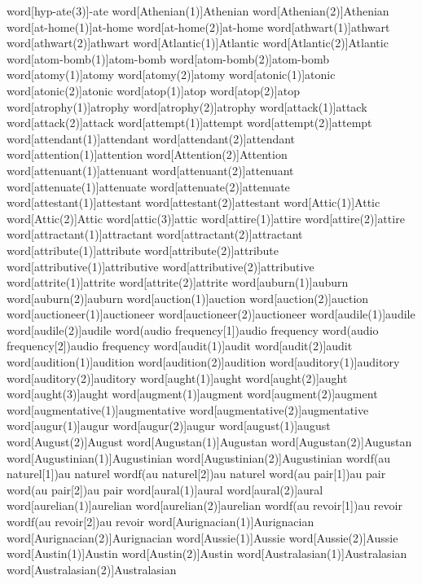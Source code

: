word[hyp-ate(3)]{-ate}
word[Athenian(1)]{Athenian}
word[Athenian(2)]{Athenian}
word[at-home(1)]{at-home}
word[at-home(2)]{at-home}
word[athwart(1)]{athwart}
word[athwart(2)]{athwart}
word[Atlantic(1)]{Atlantic}
word[Atlantic(2)]{Atlantic}
word[atom-bomb(1)]{atom-bomb}
word[atom-bomb(2)]{atom-bomb}
word[atomy(1)]{atomy}
word[atomy(2)]{atomy}
word[atonic(1)]{atonic}
word[atonic(2)]{atonic}
word[atop(1)]{atop}
word[atop(2)]{atop}
word[atrophy(1)]{atrophy}
word[atrophy(2)]{atrophy}
word[attack(1)]{attack}
word[attack(2)]{attack}
word[attempt(1)]{attempt}
word[attempt(2)]{attempt}
word[attendant(1)]{attendant}
word[attendant(2)]{attendant}
word[attention(1)]{attention}
word[Attention(2)]{Attention}
word[attenuant(1)]{attenuant}
word[attenuant(2)]{attenuant}
word[attenuate(1)]{attenuate}
word[attenuate(2)]{attenuate}
word[attestant(1)]{attestant}
word[attestant(2)]{attestant}
word[Attic(1)]{Attic}
word[Attic(2)]{Attic}
word[attic(3)]{attic}
word[attire(1)]{attire}
word[attire(2)]{attire}
word[attractant(1)]{attractant}
word[attractant(2)]{attractant}
word[attribute(1)]{attribute}
word[attribute(2)]{attribute}
word[attributive(1)]{attributive}
word[attributive(2)]{attributive}
word[attrite(1)]{attrite}
word[attrite(2)]{attrite}
word[auburn(1)]{auburn}
word[auburn(2)]{auburn}
word[auction(1)]{auction}
word[auction(2)]{auction}
word[auctioneer(1)]{auctioneer}
word[auctioneer(2)]{auctioneer}
word[audile(1)]{audile}
word[audile(2)]{audile}
word(audio frequency[1]){audio frequency}
word(audio frequency[2]){audio frequency}
word[audit(1)]{audit}
word[audit(2)]{audit}
word[audition(1)]{audition}
word[audition(2)]{audition}
word[auditory(1)]{auditory}
word[auditory(2)]{auditory}
word[aught(1)]{aught}
word[aught(2)]{aught}
word[aught(3)]{aught}
word[augment(1)]{augment}
word[augment(2)]{augment}
word[augmentative(1)]{augmentative}
word[augmentative(2)]{augmentative}
word[augur(1)]{augur}
word[augur(2)]{augur}
word[august(1)]{august}
word[August(2)]{August}
word[Augustan(1)]{Augustan}
word[Augustan(2)]{Augustan}
word[Augustinian(1)]{Augustinian}
word[Augustinian(2)]{Augustinian}
wordf(au naturel[1]){au naturel}
wordf(au naturel[2]){au naturel}
word(au pair[1]){au pair}
word(au pair[2]){au pair}
word[aural(1)]{aural}
word[aural(2)]{aural}
word[aurelian(1)]{aurelian}
word[aurelian(2)]{aurelian}
wordf(au revoir[1]){au revoir}
wordf(au revoir[2]){au revoir}
word[Aurignacian(1)]{Aurignacian}
word[Aurignacian(2)]{Aurignacian}
word[Aussie(1)]{Aussie}
word[Aussie(2)]{Aussie}
word[Austin(1)]{Austin}
word[Austin(2)]{Austin}
word[Australasian(1)]{Australasian}
word[Australasian(2)]{Australasian}
